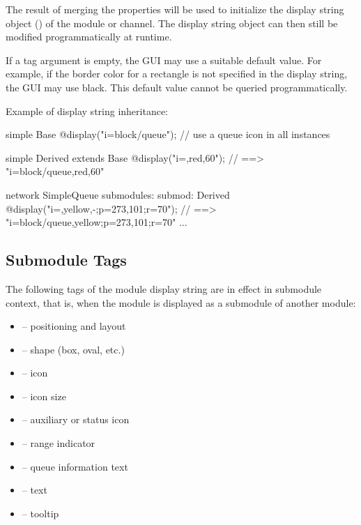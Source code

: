 The result of merging the  properties will be used to
initialize the display string object () of the
module or channel. The display string object can then still be modified
programmatically at runtime.

\begin{note}
If a tag argument is empty, the GUI may use a suitable default value. For
example, if the border color for a rectangle is not specified in the
display string, the GUI may use black. This default value cannot be
queried programmatically.
\end{note}

Example of display string inheritance:

\begin{ned}
simple Base {
    @display("i=block/queue"); // use a queue icon in all instances
}

simple Derived extends Base {
    @display("i=,red,60");  // ==> "i=block/queue,red,60"
}

network SimpleQueue {
    submodules:
        submod: Derived {
            @display("i=,yellow,-;p=273,101;r=70");
                     // ==> "i=block/queue,yellow;p=273,101;r=70"
        }
        ...
}
\end{ned}


\subsection{Submodule Tags}
\label{sec:graphics:submodule-displaystring-tags}

The following tags of the module display string are in effect in submodule
context, that is, when the module is displayed as a submodule of another
module:

\begin{itemize}
  \item {} -- positioning and layout
  \item {} -- shape (box, oval, etc.)
  \item {} -- icon
  \item {} -- icon size
  \item {} -- auxiliary or status icon
  \item {} -- range indicator
  \item {} -- queue information text
  \item {} -- text
  \item {} -- tooltip
\end{itemize}

